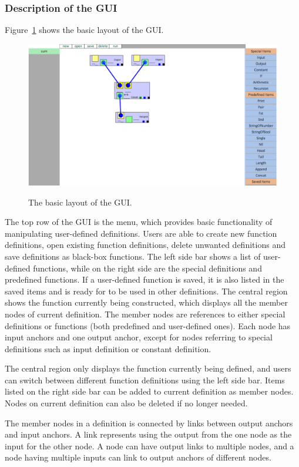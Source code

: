 \documentclass[12pt,UTF8,a4]{article}
\begin{document}
\subsubsection{Description of the GUI}
Figure~\ref{fig:gui} shows the basic layout of the GUI.
\begin{figure}[h]
\center
\includegraphics[width=.95\textwidth]{./images/gui.png} \\
\caption{The basic layout of the GUI.}\label{fig:gui}
\end{figure}
The top row of the GUI is the menu, which provides basic functionality of manipulating user-defined definitions. Users are able to create new function definitions, open existing function definitions, delete unwanted definitions and save definitions as black-box functions. The left side bar shows a list of user-defined functions, while on the right side are the special definitions and predefined functions. If a user-defined function is saved, it is also listed in the saved items and is ready for to be used in other definitions. The central region shows the function currently being constructed, which displays all the member nodes of current definition. The member nodes are references to either special definitions or functions (both predefined and user-defined ones). Each node has input anchors and one output anchor, except for nodes referring to special definitions such as input definition or constant definition.

The central region only displays the function currently being defined, and users can switch between different function definitions using the left side bar. Items listed on the right side bar can be added to current definition as member nodes. Nodes on current definition can also be deleted if no longer needed.

The member nodes in a definition is connected by links between output anchors and input anchors. A link represents using the output from the one node as the input for the other node. A node can have output links to multiple nodes, and a node having multiple inputs can link to output anchors of different nodes.
\end{document}
